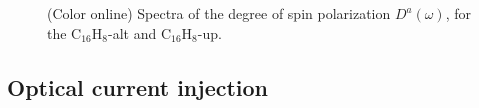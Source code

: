 \documentclass[pss]{wiley2sp} %
\begin{document}
\begin{figure}[t]
\hfill
{}
\caption{(Color online) Spectra of the degree of spin polarization
{$D^{a}(\omega)$}, for the C$_{16}$H$_{8}$-alt and
C$_{16}$H$_{8}$-up.\label{fig:Da}}
\end{figure}


\subsection{Optical current injection}\label{subsec:results-eta}
\end{document}
